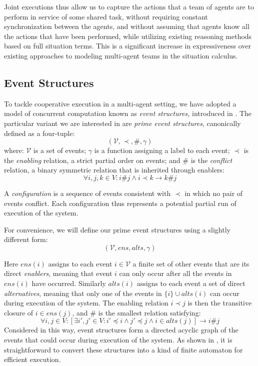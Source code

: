 Joint executions thus allow us to capture the actions that a team
of agents are to perform in service of some shared task, without requiring
constant synchronization between the agents, and without assuming
that agents know all the actions that have been performed, while utilizing
existing reasoning methods based on full situation terms. This is
a significant increase in expressiveness over existing approaches
to modeling multi-agent teams in the situation calculus.


\subsection{Event Structures}

To tackle cooperative execution in a multi-agent setting, we have
adopted a model of concurrent computation known as \emph{event structures,}
introduced in \citep{npw79event_structures}. The particular variant
we are interested in are \emph{prime event structures}, canonically
defined as a four-tuple:\[
(\mathcal{V},\prec,\#,\gamma)\]
 where: $\mathcal{V}$ is a set of events; $\gamma$ is a function
assigning a label to each event; $\prec$ is the \emph{enabling} relation,
a strict partial order on events; and $\#$ is the \emph{conflict}
relation, a binary symmetric relation that is inherited through enablers:\[
\forall i,j,k\in V:i\#j\wedge i\prec k\rightarrow k\#j\]


A \emph{configuration} is a sequence of events consistent with $\prec$
in which no pair of events conflict. Each configuration thus represents
a potential partial run of execution of the system.

For convenience, we will define our prime event structures using a
slightly different form:\[
(\mathcal{V},ens,alts,\gamma)\]


Here $ens(i)$ assigns to each event $i\in\mathcal{V}$ a finite set
of other events that are its direct \emph{enablers}, meaning that
event $i$ can only occur after all the events in $ens(i)$ have occurred.
Similarly $alts(i)$ assigns to each event a set of direct \emph{alternatives},
meaning that only one of the events in $\{i\}\cup alts(i)$ can occur
during execution of the system. The enabling relation $i\prec j$
is then the transitive closure of $i\in ens(j)$, and $\#$ is the
smallest relation satisfying:\[
\forall i,j\in V:[\exists i',j'\in V:i'\preceq i\wedge j'\preceq j\wedge i\in alts(j)]\rightarrow i\#j\]
 Considered in this way, event structures form a directed acyclic
graph of the events that could occur during execution of the system.
As shown in \citep{pratt91modeling_conc_with_geom}, it is straightforward
to convert these structures into a kind of finite automaton for efficient
execution.


